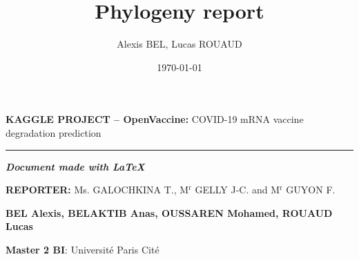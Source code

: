 \documentclass[12pt, oneside, a4paper]{report}
\title{Phylogeny report}
\author{Alexis BEL, Lucas ROUAUD}
\date{\today}
\newcommand{\p}[1]{$^\text{#1}$}
\begin{document}
\begin{huge}
    \begin{flushleft}
        \textbf{KAGGLE PROJECT -- OpenVaccine:} COVID-19 mRNA vaccine degradation prediction
    
        \vspace{1ex}
        
        \hrule height 2pt
    \end{flushleft}
\end{huge}
\vspace{2ex}
\textit{\textbf{\large Document made with \LaTeX{}}}

\textbf{REPORTER:} Ms. GALOCHKINA T., M\p{r} GELLY J-C. and M\p{r} GUYON F.

\textbf{BEL Alexis, BELAKTIB Anas, OUSSAREN Mohamed, ROUAUD Lucas}

\textbf{Master 2 BI}: Université Paris Cité

\vspace{2ex}
\end{document}

